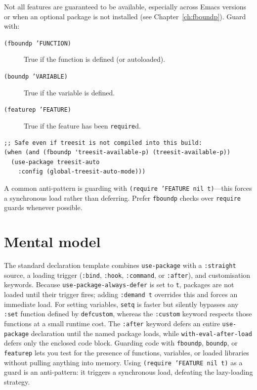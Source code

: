 Not all features are guaranteed to be available, especially across Emacs versions or when an optional package is not installed (see Chapter~\ref{ch:fboundp}).  Guard with:

\begin{description}
  \item[\texttt{(fboundp 'FUNCTION)}] True if the function is defined (or autoloaded).
  \item[\texttt{(boundp 'VARIABLE)}] True if the variable is defined.
  \item[\texttt{(featurep 'FEATURE)}] True if the feature has been \texttt{require}d.
\end{description}

\begin{verbatim}
;; Safe even if treesit is not compiled into this build:
(when (and (fboundp 'treesit-available-p) (treesit-available-p))
  (use-package treesit-auto
    :config (global-treesit-auto-mode)))
\end{verbatim}

A common anti-pattern is guarding with \texttt{(require 'FEATURE nil t)}---this forces a synchronous load rather than deferring.  Prefer \texttt{fboundp} checks over \texttt{require} guards whenever possible.

\section{Mental model}
The standard declaration template combines \texttt{use-package} with a
\texttt{:straight} source, a loading trigger (\texttt{:bind},
\texttt{:hook}, \texttt{:command}, or \texttt{:after}), and customisation
keywords.  Because \texttt{use-package-always-defer} is set to \texttt{t},
packages are not loaded until their trigger fires; adding \texttt{:demand t}
overrides this and forces an immediate load.  For setting variables,
\texttt{setq} is faster but silently bypasses any \texttt{:set} function
defined by \texttt{defcustom}, whereas the \texttt{:custom} keyword respects
those functions at a small runtime cost.  The \texttt{:after} keyword defers
an entire \texttt{use-package} declaration until the named package loads,
while \texttt{with-eval-after-load} defers only the enclosed code block.
Guarding code with \texttt{fboundp}, \texttt{boundp}, or \texttt{featurep}
lets you test for the presence of functions, variables, or loaded libraries
without pulling anything into memory.  Using \texttt{(require 'FEATURE nil t)}
as a guard is an anti-pattern: it triggers a synchronous load, defeating the
lazy-loading strategy.
